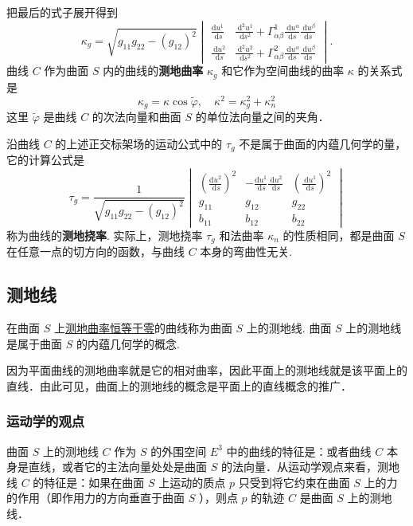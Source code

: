 把最后的式子展开得到
\[
\kappa_g=\sqrt{g_{11} g_{22}-\left(g_{12}\right)^2}\begin{vmatrix}
\frac{\mathrm{d} u^1}{\mathrm{~d} s} & \frac{\mathrm{~d}^2 u^1}{\mathrm{~d} s^2}+\Gamma_{\alpha \beta}^1 \frac{\mathrm{~d} u^\alpha}{\mathrm{d} s} \frac{\mathrm{~d} u^\beta}{\mathrm{d} s} \\
\frac{\mathrm{~d} u^2}{\mathrm{~d} s} & \frac{\mathrm{~d}^2 u^2}{\mathrm{~d} s^2}+\Gamma_{\alpha \beta}^2 \frac{\mathrm{~d} u^\alpha}{\mathrm{d} s} \frac{\mathrm{~d} u^\beta}{\mathrm{d} s}
\end{vmatrix} .
\]
曲线 $C$ 作为曲面 $S$ 内的曲线的\textbf{测地曲率} $\kappa_g$ 和它作为空间曲线的曲率 $\kappa$ 的关系式是
\[
\kappa_g=\kappa \cos \tilde{\varphi}, \quad \kappa^2=\kappa_g^2+\kappa_n^2
\]
这里 $\tilde{\varphi}$ 是曲线 $C$ 的次法向量和曲面 $S$ 的单位法向量之间的夹角．

沿曲线 $C$ 的上述正交标架场的运动公式中的 $\tau_g$ 不是属于曲面的内蕴几何学的量，它的计算公式是
\[
\tau_g=\frac{1}{\sqrt{g_{11} g_{22}-\left(g_{12}\right)^2}}\begin{vmatrix}
\left(\frac{\mathrm{d} u^2}{\mathrm{~d} s}\right)^2 & -\frac{\mathrm{d} u^1}{\mathrm{~d} s} \frac{\mathrm{~d} u^2}{\mathrm{~d} s} & \left(\frac{\mathrm{~d} u^1}{\mathrm{~d} s}\right)^2 \\
g_{11} & g_{12} & g_{22} \\
b_{11} & b_{12} & b_{22}
\end{vmatrix}
\]
称为曲线的\textbf{测地挠率}. 实际上，测地挠率 $\tau_{g}$ 和法曲率 $\kappa _n$ 的性质相同，都是曲面 $S$ 在任意一点的切方向的函数，与曲线 $C$ 本身的弯曲性无关.

\subsection{测地线}

\begin{definition}[测地线]
在曲面 $S$ 上\underline{测地曲率恒等于零}的曲线称为曲面 $S$ 上的测地线. 曲面 $S$ 上的测地线是属于曲面 $S$ 的内蕴几何学的概念.
\end{definition}
因为平面曲线的测地曲率就是它的相对曲率，因此平面上的测地线就是该平面上的直线．由此可见，曲面上的测地线的概念是平面上的直线概念的推广．

\subsubsection{运动学的观点}

曲面 $S$ 上的测地线 $C$ 作为 $S$ 的外围空间 $E^3$ 中的曲线的特征是：或者曲线 $C$ 本身是直线，或者它的主法向量处处是曲面 $S$ 的法向量．从运动学观点来看，测地线 $C$ 的特征是：如果在曲面 $S$ 上运动的质点 $p$ 只受到将它约束在曲面 $S$ 上的力的作用（即作用力的方向垂直于曲面 $S$ ），则点 $p$ 的轨迹 $C$ 是曲面 $S$ 上的测地线．

